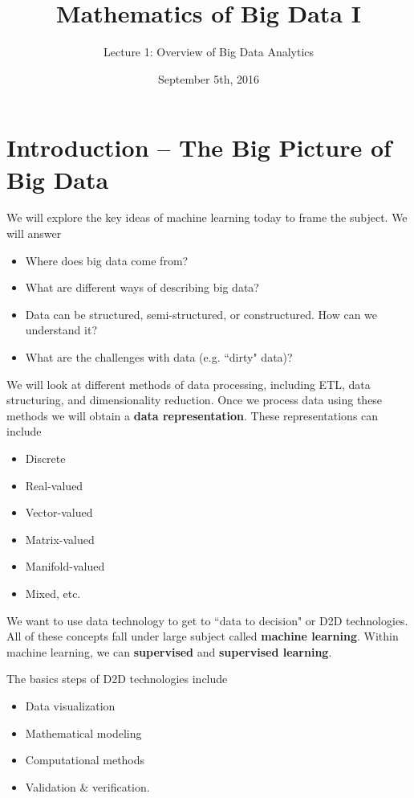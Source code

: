 \documentclass{article}
\title{Mathematics of Big Data I}
\author{Lecture 1: Overview of Big Data Analytics}
\date{September 5th, 2016}
\begin{document}
\maketitle

% 
\section{Introduction -- The Big Picture of Big Data}

\noindent We will explore the key ideas of machine learning today to frame the subject.  We will answer

\begin{itemize}
\item Where does big data come from?
\item What are different ways of describing big data?
\item Data can be structured, semi-structured, or constructured.  How can we understand it?
\item What are the challenges with data (e.g. ``dirty" data)?
\end{itemize}

\noindent We will look at different methods of data processing, including ETL, data structuring, and dimensionality reduction.  Once we process data using these methods we will obtain a \textbf{data representation}.  These representations can include

\begin{itemize}
\item Discrete
\item Real-valued
\item Vector-valued
\item Matrix-valued
\item Manifold-valued
\item Mixed, etc.
\end{itemize}

\noindent We want to use data technology to get to ``data to decision" or D2D technologies.  All of these concepts fall under large subject called \textbf{machine learning}.  Within machine learning, we can \textbf{supervised} and \textbf{supervised learning}. 

\vspace{1pc}

\noindent The basics steps of D2D technologies include

\begin{itemize}
\item Data visualization
\item Mathematical modeling
\item Computational methods
\item Validation \& verification.
\end{itemize}
\end{document}

